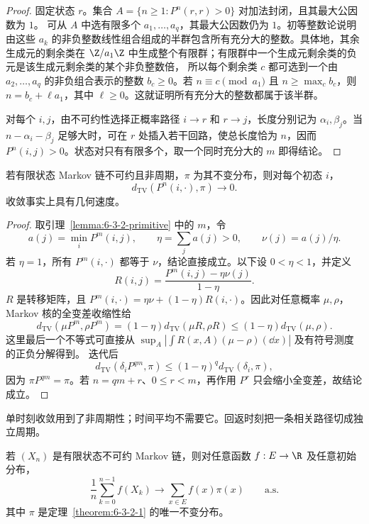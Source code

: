 \begin{proof}
固定状态 $r$。集合 $A=\{n\geq1:P^n(r,r)>0\}$ 对加法封闭，且其最大公因数为 $1$。
可从 $A$ 中选有限多个 $a_1,\ldots,a_q$，其最大公因数仍为 $1$。初等整数论说明由这些
$a_k$ 的非负整数线性组合组成的半群包含所有充分大的整数。具体地，其余生成元的剩余类在
$\Z/a_1\Z$ 中生成整个有限群；有限群中一个生成元剩余类的负元是该生成元剩余类的某个非负整数倍，
所以每个剩余类 $c$ 都可选到一个由 $a_2,\ldots,a_q$ 的非负组合表示的整数 $b_c\ge0$。若
$n\equiv c\pmod{a_1}$ 且 $n\ge\max_cb_c$，则
$n=b_c+\ell a_1$，其中 $\ell\ge0$。这就证明所有充分大的整数都属于该半群。

对每个 $i,j$，由不可约性选择正概率路径 $i\to r$ 和 $r\to j$，长度分别记为
$\alpha_i,\beta_j$。当 $n-\alpha_i-\beta_j$ 足够大时，可在 $r$ 处插入若干回路，使总长度恰为
$n$，因而 $P^n(i,j)>0$。状态对只有有限多个，取一个同时充分大的 $m$ 即得结论。
\end{proof}

\begin{theorem}[有限遍历收敛]\label{theorem:6-3-2-2}
若有限状态 Markov 链不可约且非周期，$\pi$ 为其不变分布，则对每个初态 $i$，
\[
 d_{\mathrm{TV}}(P^n(i,\cdot),\pi)\longrightarrow0.
\]
收敛事实上具有几何速度。
\end{theorem}

\begin{proof}
取引理~\ref{lemma:6-3-2-primitive} 中的 $m$，令
\[
 a(j)=\min_iP^m(i,j),\qquad
 \eta=\sum_ja(j)>0,
 \qquad \nu(j)=a(j)/\eta.
\]
若 $\eta=1$，所有 $P^m(i,\cdot)$ 都等于 $\nu$，结论直接成立。以下设 $0<\eta<1$，并定义
\[
 R(i,j)=\frac{P^m(i,j)-\eta\nu(j)}{1-\eta}.
\]
$R$ 是转移矩阵，且 $P^m(i,\cdot)=\eta\nu+(1-\eta)R(i,\cdot)$。因此对任意概率
$\mu,\rho$，Markov 核的全变差收缩性给
\[
 d_{\mathrm{TV}}(\mu P^m,\rho P^m)
 =(1-\eta)d_{\mathrm{TV}}(\mu R,\rho R)
 \leq(1-\eta)d_{\mathrm{TV}}(\mu,\rho).
\]
这里最后一个不等式可直接从
$\sup_A|\int R(x,A)(\mu-\rho)(\dd x)|$ 及有符号测度的正负分解得到。
迭代后
\[
 d_{\mathrm{TV}}(\delta_iP^{qm},\pi)
 \leq(1-\eta)^q d_{\mathrm{TV}}(\delta_i,\pi),
\]
因为 $\pi P^{qm}=\pi$。若 $n=qm+r$、$0\leq r<m$，再作用 $P^r$ 只会缩小全变差，故结论成立。
\end{proof}

单时刻收敛用到了非周期性；时间平均不需要它。回返时刻把一条相关路径切成独立周期。

\begin{theorem}[时间平均遍历定理]\label{theorem:6-3-2-3}
若 $(X_n)$ 是有限状态不可约 Markov 链，则对任意函数 $f:E\to\R$ 及任意初始分布，
\[
 \frac1n\sum_{k=0}^{n-1}f(X_k)\longrightarrow\sum_{x\in E}f(x)\pi(x)
 \qquad\text{a.s.}
\]
其中 $\pi$ 是定理~\ref{theorem:6-3-2-1} 的唯一不变分布。
\end{theorem}

